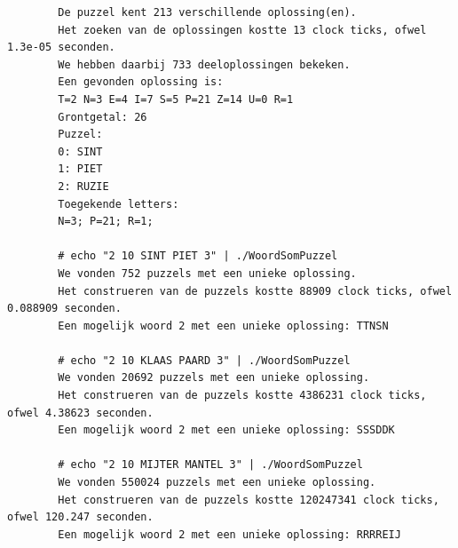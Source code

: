 \documentclass[twocolumn,10pt]{article}
\begin{document}
\begin{appendices}
\begin{lstlisting}
        De puzzel kent 213 verschillende oplossing(en).
        Het zoeken van de oplossingen kostte 13 clock ticks, ofwel 1.3e-05 seconden.
        We hebben daarbij 733 deeloplossingen bekeken.
        Een gevonden oplossing is:
        T=2 N=3 E=4 I=7 S=5 P=21 Z=14 U=0 R=1
        Grontgetal: 26 
        Puzzel:
        0: SINT
        1: PIET
        2: RUZIE
        Toegekende letters:
        N=3; P=21; R=1; 

        # echo "2 10 SINT PIET 3" | ./WoordSomPuzzel
        We vonden 752 puzzels met een unieke oplossing.
        Het construeren van de puzzels kostte 88909 clock ticks, ofwel 0.088909 seconden.
        Een mogelijk woord 2 met een unieke oplossing: TTNSN

        # echo "2 10 KLAAS PAARD 3" | ./WoordSomPuzzel
        We vonden 20692 puzzels met een unieke oplossing.
        Het construeren van de puzzels kostte 4386231 clock ticks, ofwel 4.38623 seconden.
        Een mogelijk woord 2 met een unieke oplossing: SSSDDK

        # echo "2 10 MIJTER MANTEL 3" | ./WoordSomPuzzel
        We vonden 550024 puzzels met een unieke oplossing.
        Het construeren van de puzzels kostte 120247341 clock ticks, ofwel 120.247 seconden.
        Een mogelijk woord 2 met een unieke oplossing: RRRREIJ

        
    \end{lstlisting}
 

\end{appendices}
\end{document}

